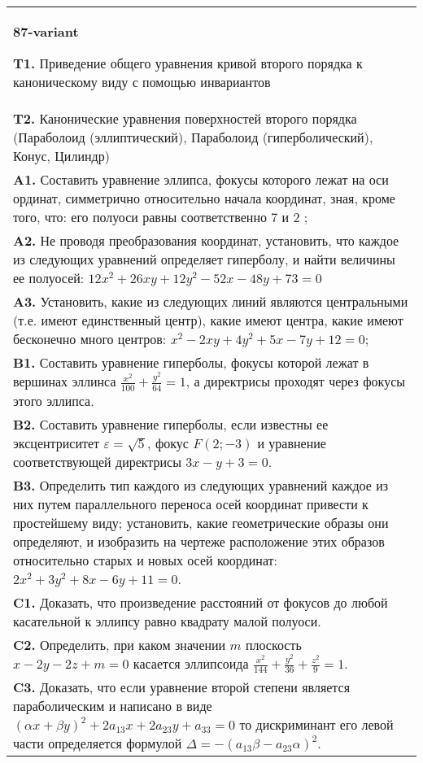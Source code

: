 \documentclass{article}
\begin{document}
\begin{tabular}{m{17cm}}
\textbf{87-variant}
\newline

\textbf{T1.} Приведение общего уравнения кривой второго порядка к каноническому виду с помощью инвариантов \\
\textbf{T2.} Канонические уравнения поверхностей второго порядка (Параболоид (эллиптический), Параболоид (гиперболический), Конус, Цилиндр) \\
\textbf{A1.} Составить уравнение эллипса, фокусы которого лежат на оси ординат, симметрично относительно начала координат, зная, кроме того, что: его полуоси равны соответственно 7 и 2 ; \\
\textbf{A2.} Не проводя преобразования координат, установить, что каждое из следующих уравнений определяет гиперболу, и найти величины ее полуосей: $12 x^2+26 x y+12 y^2-52 x-48 y+73=0$ \\
\textbf{A3.} Установить, какие из следующих линий являются центральными (т.е. имеют единственный центр), какие имеют центра, какие имеют бесконечно много центров: $x^2-2 x y+4 y^2+5 x-7 y+12=0$; \\
\textbf{B1.} Составить уравнение гиперболы, фокусы которой лежат в вершинах эллинса $\frac{x^2}{100}+\frac{y^2}{64}=1$, а директрисы проходят через фокусы этого эллипса. \\
\textbf{B2.} Составить уравнение гиперболы, если известны ее эксцентриситет $\varepsilon=\sqrt{5}$, фокус $F(2 ;-3)$ и уравнение соответствующей директрисы $3 x-y+3=0$. \\
\textbf{B3.} Определить тип каждого из следующих уравнений каждое из них путем параллельного переноса осей координат привести к простейшему виду; установить, какие геометрические образы они определяют, и изобразить на чертеже расположение этих образов относительно старых и новых осей координат: $2 x^2+3 y^2+8 x-6 y+11=0$. \\
\textbf{C1.} Доказать, что произведение расстояний от фокусов до любой касательной к эллипсу равно квадрату малой полуоси. \\
\textbf{C2.} Определить, при каком значении $m$ плоскость $x-2 y-2 z+m=0$ касается эллипсоида $\frac{x^2}{144}+\frac{y^2}{36}+\frac{z^2}{9}=1$. \\
\textbf{C3.} Доказать, что если уравнение второй степени является параболическим и написано в виде $ (\alpha x+\beta y) ^2+2a_{13}x+2a_{23}y+a_{33}=0$ то дискриминант его левой части определяется формулой $\Delta=- (a_{13} \beta-a_{23} \alpha) ^2$. \\

\end{tabular}
\vspace{1cm}
\end{document}
